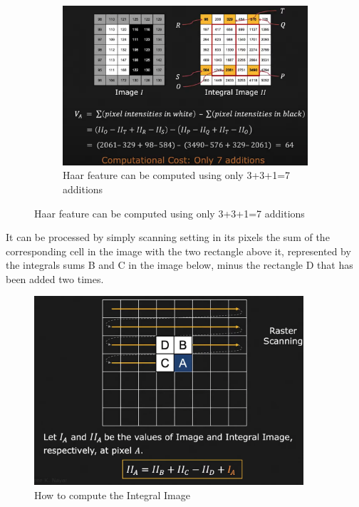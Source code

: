 \documentclass[12pt,a4paper]{article}
\begin{document}
\begin{large}
\begin{figure} [!hbp]
\begin{subfigure}[b]{0.4\textwidth}
    \end{subfigure}
    \hspace{0.1cm}
    \begin{subfigure}[b]{0.4\textwidth}
    \centering
    \captionsetup{justification=centering}
      \includegraphics[width=\textwidth]{images/haar9.png}
      \caption{Haar feature can be computed using only 3+3+1=7 additions}
      
    \end{subfigure}
  \end{figure}
It can be processed by simply scanning setting in its pixels the sum of the corresponding cell in the image with the two rectangle above it, represented by the integrals sums B and C in the image below, minus the rectangle D that has been added two times.
\begin{figure} [!h]
  \centering
  \captionsetup{justification=centering}
  \includegraphics[width=10cm]{images/haar10.png}
  \caption{How to compute the Integral Image}
  \end{figure}


\end{large}
\end{document}
